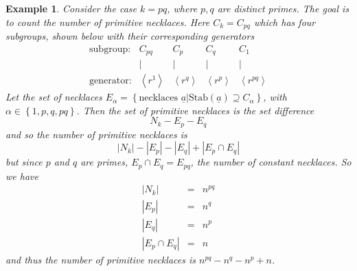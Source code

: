 \documentclass[english]{article}
\newtheorem{example}[theorem]{Example}
\begin{document}
\begin{example}

Consider the case $k=pq$, where $p,q$ are distinct primes. The goal
is to count the number of \emph{primitive} necklaces. Here $C_{k}=C_{pq}$
which has four subgroups, shown below with their corresponding generators\[
\begin{array}{ccccc}
\text{subgroup:} & C_{pq} & C_{p} & C_{q} & C_{1}\\
 & | & | & | & |\\
\text{generator:} & \left\langle r^{1}\right\rangle  & \left\langle r^{q}\right\rangle  & \left\langle r^{p}\right\rangle  & \left\langle r^{pq}\right\rangle \end{array}\]
Let the set of necklaces $E_{\alpha}=\left\{ \text{necklaces }\underline{a}|\text{Stab}\left(\underline{a}\right)\supseteq C_{\alpha}\right\} $,
with $\alpha\in\left\{ 1,p,q,pq\right\} $. Then the set of primitive
necklaces is the set difference\[
N_{k}-E_{p}-E_{q}\]
and so the number of primitive necklaces is\[
\left|N_{k}\right|-\left|E_{p}\right|-\left|E_{q}\right|+\left|E_{p}\cap E_{q}\right|\]
but since $p$ and $q$ are primes, $E_{p}\cap E_{q}=E_{pq}$, the
number of constant necklaces. So we have\begin{eqnarray*}
\left|N_{k}\right| & = & n^{pq}\\
\left|E_{p}\right| & = & n^{q}\\
\left|E_{q}\right| & = & n^{p}\\
\left|E_{p}\cap E_{q}\right| & = & n\end{eqnarray*}
 and thus the number of \emph{primitive} necklaces is $n^{pq}-n^{q}-n^{p}+n$.

\end{example}
\end{document}

